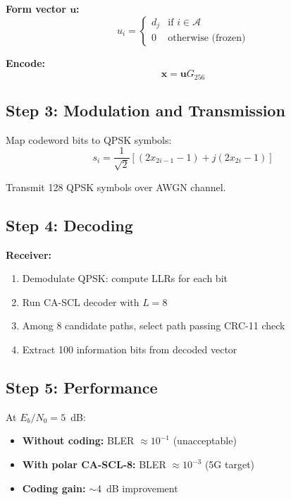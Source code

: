 \textbf{Form vector $\mathbf{u}$:}
\begin{equation}
u_i = \begin{cases}
d_j & \text{if } i \in \mathcal{A} \\
0 & \text{otherwise (frozen)}
\end{cases}
\end{equation}

\textbf{Encode:}
\begin{equation}
\mathbf{x} = \mathbf{u} G_{256}
\end{equation}

\subsection*{Step 3: Modulation and Transmission}

Map codeword bits to QPSK symbols:
\begin{equation}
s_i = \frac{1}{\sqrt{2}}[(2x_{2i-1} - 1) + j(2x_{2i} - 1)]
\end{equation}

Transmit 128 QPSK symbols over AWGN channel.

\subsection*{Step 4: Decoding}

\textbf{Receiver:}
\begin{enumerate}
\item Demodulate QPSK: compute LLRs for each bit
\item Run CA-SCL decoder with $L = 8$
\item Among 8 candidate paths, select path passing CRC-11 check
\item Extract 100 information bits from decoded vector
\end{enumerate}

\subsection*{Step 5: Performance}

At $E_b/N_0 = 5$~dB:
\begin{itemize}
\item \textbf{Without coding:} BLER $\approx 10^{-1}$ (unacceptable)
\item \textbf{With polar CA-SCL-8:} BLER $\approx 10^{-3}$ (5G target)
\item \textbf{Coding gain:} $\sim$4~dB improvement
\end{itemize}

